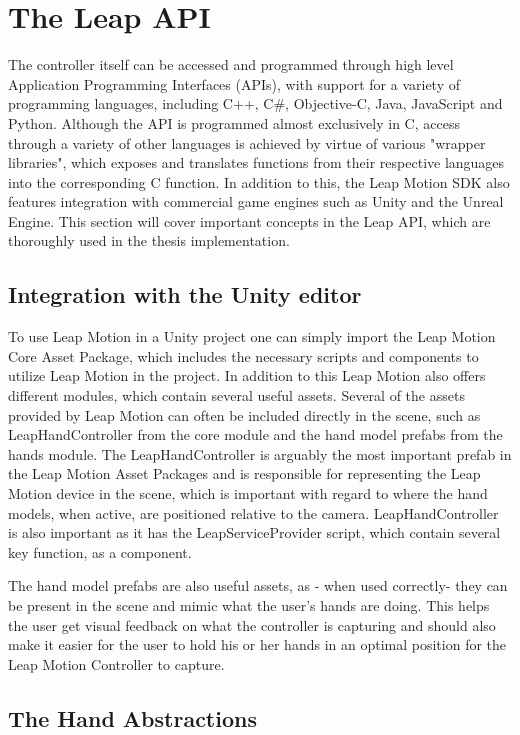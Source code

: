 \section{The Leap API}
The controller itself can be accessed and programmed through high level Application Programming Interfaces (APIs), with support for a variety of programming languages, 
including C++, C\#, Objective-C, Java, JavaScript and Python. Although the API is programmed almost exclusively in C, access through a variety of other languages 
is achieved by virtue of various "wrapper libraries", which exposes and translates functions from their respective languages into the corresponding C function.
In addition to this, the Leap Motion SDK also features integration with commercial game engines such as Unity and the Unreal Engine. 
This section will cover important concepts in the Leap API, which are thoroughly used in the thesis implementation.

\subsection{Integration with the Unity editor}
To use Leap Motion in a Unity project one can simply import the Leap Motion Core Asset Package, which includes the necessary scripts and components to utilize Leap Motion in the 
project. In addition to this Leap Motion also offers different modules, which contain several useful assets. 
Several of the assets provided by Leap Motion can often be included directly in the scene, such as LeapHandController from the core module and the hand model prefabs 
from the hands module.
The LeapHandController is arguably the most important prefab in the Leap Motion Asset Packages and is responsible for representing the Leap Motion device 
in the scene, which is important with regard to where the hand models, when active, are positioned relative to the camera. 
LeapHandController is also important as it has the LeapServiceProvider script, which contain several key function, as a component.

The hand model prefabs are also useful assets, as - when used correctly- they can be present in the scene and mimic what the user's hands are doing.
This helps the user get visual feedback on what the controller is capturing and should also make it easier for the user to 
hold his or her hands in an optimal position for the Leap Motion Controller to capture.


\subsection{The Hand Abstractions}

